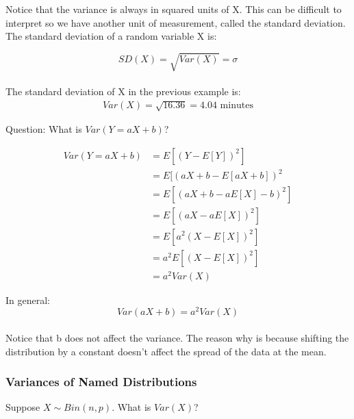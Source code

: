\documentclass[12pt, letterpaper]{article}
\begin{document}
Notice that the variance is always in squared units of X. This can be difficult to interpret so we have another unit of measurement, called the standard deviation. The standard deviation of a random variable X is:

\begin{equation}
SD\left(X\right) = \sqrt{Var\left(X\right)} = \sigma
\end{equation}\\

The standard deviation of X in the previous example is:
\begin{align*}
Var\left(X\right) = \sqrt{16.36} = 4.04 \text{ minutes}
\end{align*}

Question: What is \(Var\left(Y = aX + b\right)\)?

\begin{align*}
Var\left(Y = aX + b\right) &= E[(Y - E[Y])^2]\\
&= E[(aX + b - E[aX + b])^2\\
&= E[(aX + b - aE[X] - b)^2]\\
&= E[(aX - aE[X])^2]\\
&= E[a^2(X - E[X])^2]\\
&= a^2 E[(X - E[X])^2]\\
&= a^2 Var\left(X\right)
\end{align*}

In general:
\begin{equation}
Var\left(aX + b\right) = a^2 Var\left(X\right)
\end{equation}\\

Notice that b does not affect the variance. The reason why is because shifting the distribution by a constant doesn't affect the spread of the data at the mean.

\subsubsection{Variances of Named Distributions}
Suppose \(X \sim Bin(n, p)\). What is \(Var\left(X\right)\)?
\end{document}
